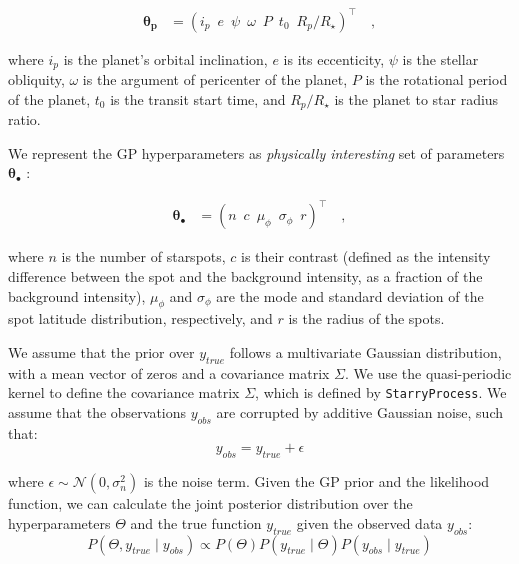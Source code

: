 \documentclass[twocolumn]{aastex631}
\begin{document}
\begin{linenomath}\begin{align}
    \label{eq:thetap}
    \pmb{\theta_p}
     & =
    \left(
    i_p
    \,\,\,
    e
    \,\,\,
    \psi
    \,\,\,
    \omega
    \,\,\,
    P
    \,\,\,
    t_0
    \,\,\,
    R_p/R_\star
    \right)^\top
    \quad,
\end{align}\end{linenomath}
where $i_p$ is the planet's orbital inclination, $e$ is its eccenticity, $\psi$ is the stellar obliquity, $\omega$ is the argument of pericenter of the planet,
$P$ is the rotational period of the planet, $t_0$ is the transit start time, and $R_p/R_\star$ is the planet to star radius ratio.

We represent the GP hyperparameters as \emph{physically interesting} set of parameters $\pmb{\theta}_\bullet$ \citep{Luger2021}:
%
\begin{linenomath}\begin{align}
        \label{eq:thetaspot}
        \pmb{\theta}_\bullet
         & =
        \left(
        n
        \,\,\,
        c
        \,\,\,
        \mu_\phi
        \,\,\,
        \sigma_\phi
        \,\,\,
        r
        \right)^\top
        \quad,
    \end{align}\end{linenomath}
%
where $n$ is the number of starspots, $c$ is their contrast (defined as the intensity difference between the spot and the 
background intensity, as a fraction of the background intensity),
$\mu_\phi$ and $\sigma_\phi$ are the mode and standard deviation
of the spot latitude distribution, respectively, and $r$ is the radius
of the spots.

We assume that the prior over $y_{true}$ follows a multivariate Gaussian distribution, with a mean vector of zeros and a covariance 
matrix $\Sigma$. We use the quasi-periodic kernel to define the covariance matrix $\Sigma$, which is defined by \texttt{StarryProcess}.
We assume that the observations $y_{obs}$ are corrupted by additive Gaussian noise, such that:
\begin{equation}
    y_{obs} = y_{true} + \epsilon
\end{equation}

where $\epsilon \sim \mathcal{N}(0, \sigma_n^2)$ is the noise term. Given the GP prior and the likelihood function, we can 
calculate the joint posterior distribution over the hyperparameters $\Theta$ and the true function $y_{true}$ given the observed data $y_{obs}$:
\begin{equation}
    P(\Theta, y_{true} \mid y_{obs}) \propto P(\Theta) P(y_{true} \mid \Theta) P(y_{obs} \mid y_{true})
\end{equation}
\end{document}

